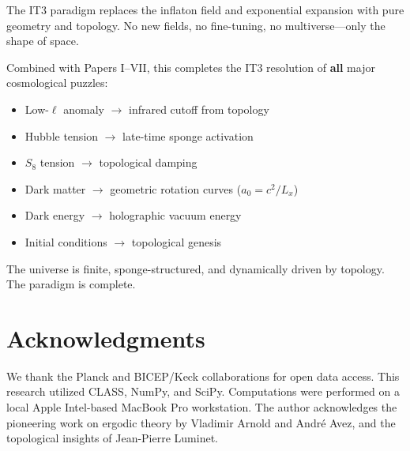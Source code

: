 \documentclass[12pt,a4paper]{article}
\begin{document}
The IT3 paradigm replaces the inflaton field and exponential expansion with pure geometry and topology. No new fields, no fine-tuning, no multiverse---only the shape of space.

Combined with Papers I--VII, this completes the IT3 resolution of \textbf{all} major cosmological puzzles:
\begin{itemize}
    \item Low-$\ell$ anomaly $\rightarrow$ infrared cutoff from topology
    \item Hubble tension $\rightarrow$ late-time sponge activation
    \item $S_8$ tension $\rightarrow$ topological damping
    \item Dark matter $\rightarrow$ geometric rotation curves ($a_0 = c^2/L_x$)
    \item Dark energy $\rightarrow$ holographic vacuum energy
    \item Initial conditions $\rightarrow$ topological genesis
\end{itemize}

The universe is finite, sponge-structured, and dynamically driven by topology. The paradigm is complete.

\section*{Acknowledgments}

We thank the Planck and BICEP/Keck collaborations for open data access. This research utilized CLASS, NumPy, and SciPy. Computations were performed on a local Apple Intel-based MacBook Pro workstation. The author acknowledges the pioneering work on ergodic theory by Vladimir Arnold and Andr\'e Avez, and the topological insights of Jean-Pierre Luminet.
\end{document}
